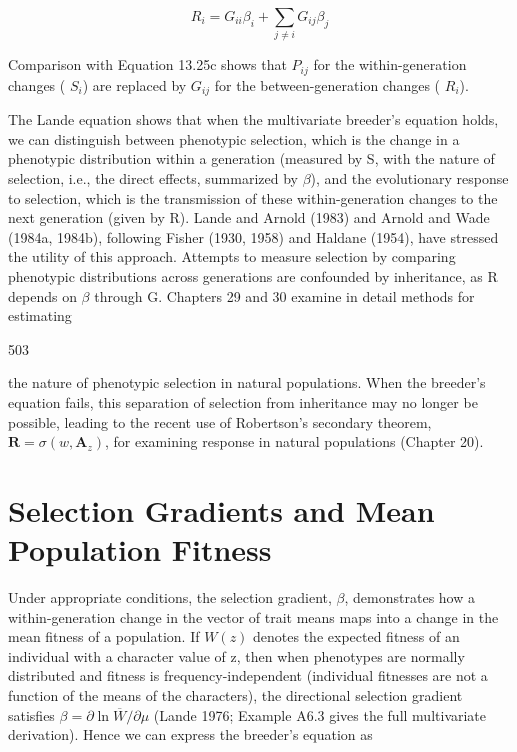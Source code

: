 \documentclass{article}
\begin{document}
\begin{equation}
R_{i}=G_{ii}\beta_{i}+\sum_{j\neq i}G_{ij}\beta_{j}
\tag{13.26d}
\label{eq:13_26d}
\end{equation}

Comparison with Equation 13.25c shows that  $ P_{ij} $ for the within-generation changes ( $ S_i $) are replaced by  $ G_{ij} $ for the between-generation changes ( $ R_i $).

The Lande equation shows that when the multivariate breeder's equation holds, we can distinguish between phenotypic selection, which is the change in a phenotypic distribution within a generation (measured by S, with the nature of selection, i.e., the direct effects, summarized by  $ \beta $), and the evolutionary response to selection, which is the transmission of these within-generation changes to the next generation (given by R). Lande and Arnold (1983) and Arnold and Wade (1984a, 1984b), following Fisher (1930, 1958) and Haldane (1954), have stressed the utility of this approach. Attempts to measure selection by comparing phenotypic distributions across generations are confounded by inheritance, as R depends on  $ \beta $ through G. Chapters 29 and 30 examine in detail methods for estimating

503

the nature of phenotypic selection in natural populations. When the breeder’s equation fails, this separation of selection from inheritance may no longer be possible, leading to the recent use of Robertson’s secondary theorem,  $ \mathbf{R} = \sigma(w, \mathbf{A}_z) $, for examining response in natural populations (Chapter 20).

\section{Selection Gradients and Mean Population Fitness}
Under appropriate conditions, the selection gradient,  $ \beta $, demonstrates how a within-generation change in the vector of trait means maps into a change in the mean fitness of a population. If  $ W(z) $ denotes the expected fitness of an individual with a character value of z, then when phenotypes are normally distributed and fitness is frequency-independent (individual fitnesses are not a function of the means of the characters), the directional selection gradient satisfies  $ \beta = \partial \ln \overline{W} / \partial \mu $ (Lande 1976; Example A6.3 gives the full multivariate derivation). Hence we can express the breeder's equation as
\end{document}
